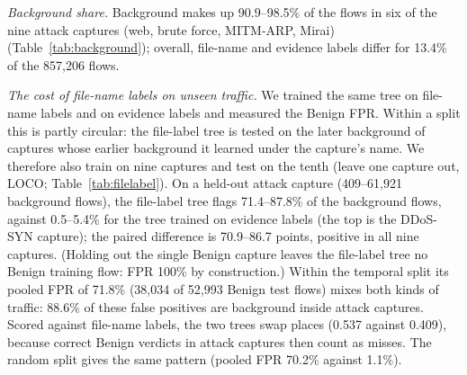 \emph{Background share.} Background makes up 90.9--98.5\% of the flows in six of the nine attack captures (web, brute force, MITM-ARP, Mirai) (Table~\ref{tab:background}); overall, file-name and evidence labels differ for 13.4\% of the 857,206 flows.

\emph{The cost of file-name labels on unseen traffic.} We trained the same tree on file-name labels and on evidence labels and measured the Benign FPR. Within a split this is partly circular: the file-label tree is tested on the later background of captures whose earlier background it learned under the capture's name. We therefore also train on nine captures and test on the tenth (leave one capture out, LOCO; Table~\ref{tab:filelabel}). On a held-out attack capture (409--61,921 background flows), the file-label tree flags 71.4--87.8\% of the background flows, against 0.5--5.4\% for the tree trained on evidence labels (the top is the DDoS-SYN capture); the paired difference is 70.9--86.7 points, positive in all nine captures. (Holding out the single Benign capture leaves the file-label tree no Benign training flow: FPR 100\% by construction.) Within the temporal split its pooled FPR of 71.8\% (38,034 of 52,993 Benign test flows) mixes both kinds of traffic: 88.6\% of these false positives are background inside attack captures. Scored against file-name labels, the two trees swap places (0.537 against 0.409), because correct Benign verdicts in attack captures then count as misses. The random split gives the same pattern (pooled FPR 70.2\% against 1.1\%).

